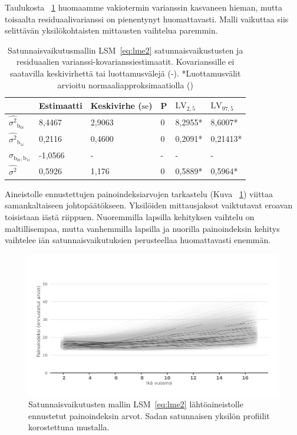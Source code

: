 \documentclass[finnish]{docopts}
\begin{document}
Taulukosta ~\ref{table:lme3} huomaamme vakiotermin varianssin kasvaneen hieman, mutta toisaalta residuaalivarianssi on pienentynyt huomattavasti. Malli vaikuttaa siis selittävän yksilökohtaisten mittausten vaihtelua paremmin.\\

\begin{table}[H]
\centering
\begin{tabular}{llllll}
\toprule
  & Estimaatti & Keskivirhe ($\text{se}$) & P & $\text{LV}_{2,5}$ & $\text{LV}_{97,5}$\\
\midrule
$\hat{\sigma^2}_{\text{b}_{0i}}$ & 8,4467 & 2,9063 & 0 & 8,2955* & 8,6007*\\
$\hat{\sigma^2}_{\text{b}_{1i}}$ & 0,2116 & 0,4600 & 0 & 0,2091* & 0,21413*\\
$\hat{\sigma}_{\text{b}_{0i}, \text{b}_{1i}}$ & -1,0566 & - & - & - & -\\
\addlinespace
$\hat{\sigma^2}$ & 0,5926 & 1,176 & 0 & 0,5889* & 0,5964*\\
\bottomrule
\end{tabular}
\caption{Satunnaisvaikutusmallin LSM~\ref{eq:lme2} satunnaisvaikustusten ja residuaalien varianssi-kovarianssiestimaatit. Kovarianssille ei saatavilla keskivirhettä tai luottamusvälejä (-). *Luottamusvälit arvioitu normaaliapproksimaatiolla (\cite{pinheiro00})}
\label{table:lme3}
\end{table}

Aineistolle ennustettujen painoindeksiarvojen tarkastelu (Kuva ~\ref{fig:lme2_bmi_pred}) viittaa samankaltaiseen johtopäätökseen. Yksilöiden mittausjaksot vaiktutavat eroavan toisistaan iästä riippuen. Nuoremmilla lapsilla kehityksen vaihtelu on maltillisempaa, mutta vanhemmilla lapsilla ja nuorilla painoindeksin kehitys vaihtelee iän satunnaisvaikutuksien perusteellaa huomattavasti enemmän.\\

\begin{figure}[H]
\centering
  \includegraphics[scale=0.8]{kuvaajat/lme2_bmi_ennuste.png}
  \caption{Satunnaisvaikutusten mallin LSM~\ref{eq:lme2} lähtöaineistolle ennustetut painoindeksin arvot. Sadan satunnaisen yksilön profiilit korostettuna mustalla.}
  \label{fig:lme2_bmi_pred}
\end{figure}
\end{document}

